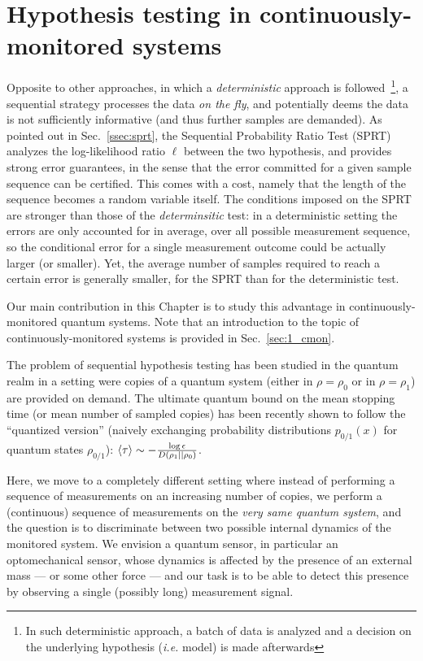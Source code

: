 \section{Hypothesis testing in continuously-monitored systems}
Opposite to other approaches, in which a \textit{deterministic} approach is followed~\cite{Kiilerich2018Hypothesis}\footnote{In such deterministic approach, a batch of data is analyzed and a decision on the underlying hypothesis (\textit{i.e.} model) is made afterwards}, a sequential strategy processes the data \textit{on the fly}, and potentially deems the data is not sufficiently informative (and thus further samples are demanded). As pointed out in Sec.~\ref{ssec:sprt}, the Sequential Probability Ratio Test (SPRT) analyzes the log-likelihood ratio $\ell$ between the two hypothesis, and provides strong error guarantees, in the sense that the error committed for a given sample sequence can be certified. This comes with a cost, namely that the length of the  sequence becomes a random variable itself. The conditions imposed  on the SPRT  are stronger than those of the \textit{determinsitic} test:
in a deterministic setting the errors are only accounted for in average, over all possible measurement sequence, so the conditional error for a single measurement outcome could be actually larger (or smaller).
Yet, the average number of samples required to reach a certain error is generally smaller, for the SPRT than for the deterministic test.

Our main contribution in this Chapter is to study this advantage in continuously-monitored quantum systems. Note that an introduction to the topic of continuously-monitored systems is provided in Sec.~\ref{sec:1_cmon}.

The problem of sequential hypothesis testing has been studied in the quantum realm \cite{Vargas2021quantum, Li2022seq} in a setting were copies of a quantum system (either in $\rho=\rho_{0}$ or in $\rho=\rho_{1}$)
are provided on demand. The ultimate quantum bound on the mean stopping time (or mean number of sampled copies) has been recently shown to follow the ``quantized version'' (naively exchanging probability distributions $p_{0/1}(x)$ for quantum states $\rho_{0/1}$): $\mathinner{\langle \tau\rangle}\sim -\tfrac{\log\epsilon}{D(\rho_{1}||\rho_{0})}$.

Here, we move to a completely different setting where instead of performing a sequence of measurements on an increasing number of copies, we perform a (continuous) sequence of measurements on the \emph{very same quantum system}, and the question is to discriminate between two possible internal dynamics of the monitored  system. We envision a quantum sensor, in particular an optomechanical sensor, whose dynamics is affected by the presence of an external mass --- or some other force --- and our task is to be able to detect this presence by observing a single (possibly long) measurement signal.

